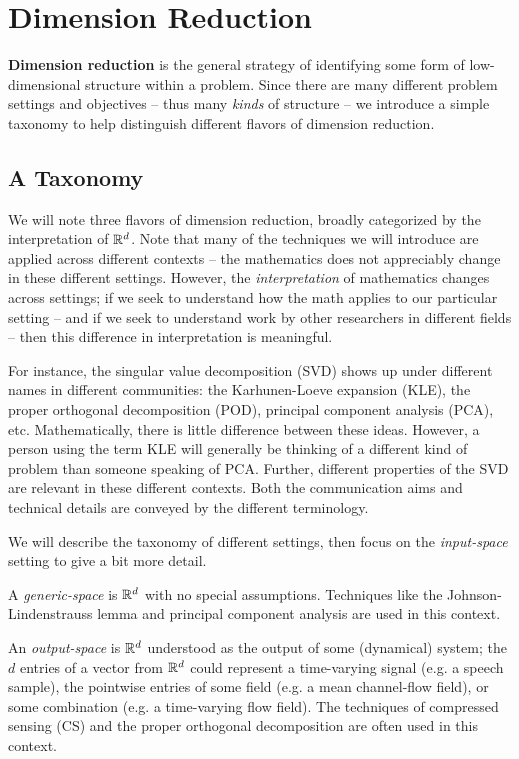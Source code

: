 \documentclass{article}
\begin{document}
\section{Dimension Reduction}

\textbf{Dimension reduction} is the general strategy of identifying some form of
low-dimensional structure within a problem. Since there are many different
problem settings and objectives -- thus many \emph{kinds} of structure -- we
introduce a simple taxonomy to help distinguish different flavors of dimension
reduction.

\subsection{A Taxonomy}
We will note three flavors of dimension reduction, broadly categorized by the
interpretation of $\mathbb{R}^{d}$. Note that many of the techniques we will introduce
are applied across different contexts -- the mathematics does not appreciably
change in these different settings. However, the \emph{interpretation} of
mathematics changes across settings; if we seek to understand how the math
applies to our particular setting -- and if we seek to understand work by other
researchers in different fields -- then this difference in interpretation is
meaningful.

For instance, the singular value decomposition (SVD) shows up under different
names in different communities: the Karhunen-Loeve expansion (KLE), the proper
orthogonal decomposition (POD), principal component analysis (PCA), etc.
Mathematically, there is little difference between these ideas. However, a
person using the term KLE will generally be thinking of a different kind of
problem than someone speaking of PCA. Further, different properties of the SVD
are relevant in these different contexts. Both the communication aims and
technical details are conveyed by the different terminology.

We will describe the taxonomy of different settings, then focus on the
\emph{input-space} setting to give a bit more detail.

\bigskip\noindent A \emph{generic-space} is $\mathbb{R}^{d}$ with no special assumptions.
Techniques like the Johnson-Lindenstrauss lemma and principal component
analysis\cite{fodor2002survey} are used in this context.

\bigskip\noindent An \emph{output-space} is $\mathbb{R}^{d}$ understood as the output of
some (dynamical) system; the $d$ entries of a vector from $\mathbb{R}^{d}$ could
represent a time-varying signal (e.g. a speech sample), the pointwise entries of
some field (e.g. a mean channel-flow field), or some combination (e.g. a
time-varying flow field). The techniques of compressed sensing
(CS)\cite{candes2008introduction} and the proper orthogonal
decomposition\cite{lumley2007} are often used in this context.
\end{document}
